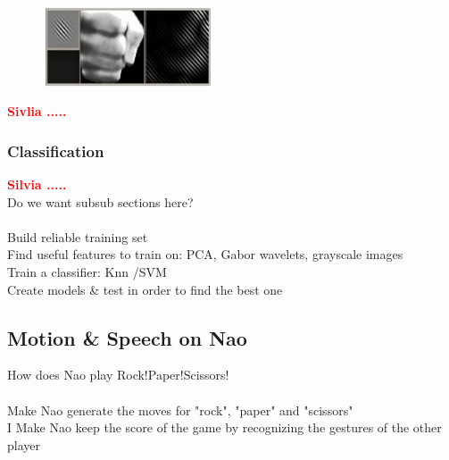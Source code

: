 \documentclass[a4paper, 11pt, twocolumn]{article}
\newcommand{\todo}[1]{\textcolor{red}{\textbf{#1}}}
\begin{document}
		\begin{flushleft}
		\begin{figure}[!hbtp]
		   \centering
		   \includegraphics[width=0.45\textwidth]{gabor.png}
	   	\end{figure}	
		\end{flushleft}

		\todo{Sivlia .....}\\

		\subsubsection{Classification}
		\todo{Silvia .....}\\


        Do we want subsub sections here?\\\\
        Build reliable training set\\
        Find useful features to train on: PCA, Gabor wavelets, grayscale images\\
        Train a classifier: Knn /SVM\\
        Create models \& test in order to find the best one\\
        
        \subsection{Motion \& Speech on Nao}
		\label{sec:Meth_naoPlay}
        How does Nao play Rock!Paper!Scissors!\\\\
        Make Nao generate the moves for "rock", "paper" and "scissors"\\
        I Make Nao keep the score of the game by recognizing the gestures of the
        other player
\end{document}
